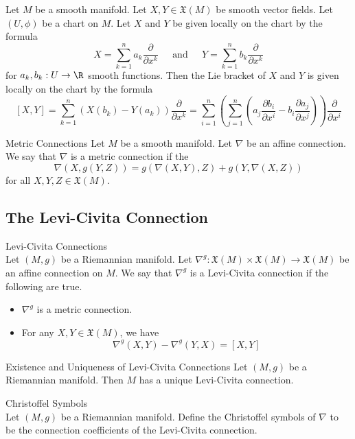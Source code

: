 \documentclass[a4paper]{article}
\begin{document}
\begin{prp}{}{} Let $M$ be a smooth manifold. Let $X,Y\in\mathfrak{X}(M)$ be smooth vector fields. Let $(U,\phi)$ be a chart on $M$. Let $X$ and $Y$ be given locally on the chart by the formula $$X=\sum_{k=1}^na_k\frac{\partial}{\partial x^k}\;\;\;\;\text{ and }\;\;\;\;Y=\sum_{k=1}^nb_k\frac{\partial}{\partial x^k}$$ for $a_k,b_k:U\to\R$ smooth functions. Then the Lie bracket of $X$ and $Y$ is given locally on the chart by the formula $$[X,Y]=\sum_{k=1}^n\left(X(b_k)-Y(a_k)\right)\frac{\partial}{\partial x^k}=\sum_{i=1}^n\left(\sum_{j=1}^n\left(a_j\frac{\partial b_i}{\partial x^i}-b_i\frac{\partial a_j}{\partial x^j}\right)\right)\frac{\partial}{\partial x^i}$$
\end{prp}

\begin{defn}{Metric Connections}{} Let $M$ be a smooth manifold. Let $\nabla$ be an affine connection. We say that $\nabla$ is a metric connection if the $$\nabla(X,g(Y,Z))=g(\nabla(X,Y),Z)+g(Y,\nabla(X,Z))$$ for all $X,Y,Z\in\mathfrak{X}(M)$. 
\end{defn}

\subsection{The Levi-Civita Connection}
\begin{defn}{Levi-Civita Connections}{}\\
Let $(M,g)$ be a Riemannian manifold. Let $\nabla^g:\mathfrak{X}(M)\times\mathfrak{X}(M)\to\mathfrak{X}(M)$ be an affine connection on $M$. We say that $\nabla^g$ is a Levi-Civita connection if the following are true. 
\begin{itemize}
\item $\nabla^g$ is a metric connection. 
\item For any $X,Y\in\mathfrak{X}(M)$, we have $$\nabla^g(X,Y)-\nabla^g(Y,X)=[X,Y]$$
\end{itemize}
\end{defn}

\begin{thm}{Existence and Uniqueness of Levi-Civita Connections}{} Let $(M,g)$ be a Riemannian manifold. Then $M$ has a unique Levi-Civita connection. 
\end{thm}

\begin{defn}{Christoffel Symbols}{}\\
Let $(M,g)$ be a Riemannian manifold. Define the Christoffel symbols of $\nabla$ to be the connection coefficients of the Levi-Civita connection. 
\end{defn}
\end{document}
